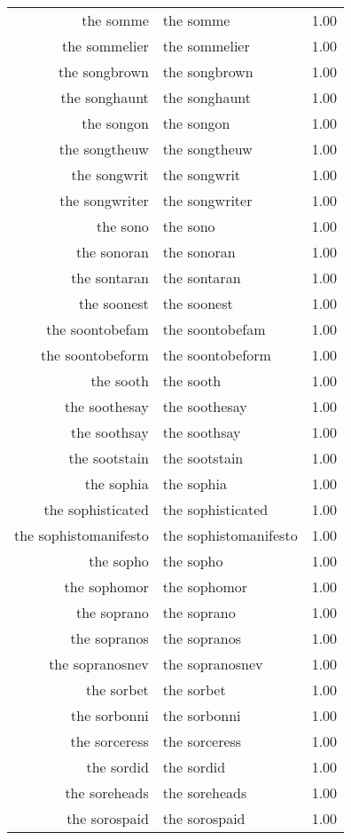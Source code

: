 \begin{table}[ht]
\begin{tabular}{rlr}
  the somme & the somme & 1.00 \\ 
  the sommelier & the sommelier & 1.00 \\ 
  the songbrown & the songbrown & 1.00 \\ 
  the songhaunt & the songhaunt & 1.00 \\ 
  the songon & the songon & 1.00 \\ 
  the songtheuw & the songtheuw & 1.00 \\ 
  the songwrit & the songwrit & 1.00 \\ 
  the songwriter & the songwriter & 1.00 \\ 
  the sono & the sono & 1.00 \\ 
  the sonoran & the sonoran & 1.00 \\ 
  the sontaran & the sontaran & 1.00 \\ 
  the soonest & the soonest & 1.00 \\ 
  the soontobefam & the soontobefam & 1.00 \\ 
  the soontobeform & the soontobeform & 1.00 \\ 
  the sooth & the sooth & 1.00 \\ 
  the soothesay & the soothesay & 1.00 \\ 
  the soothsay & the soothsay & 1.00 \\ 
  the sootstain & the sootstain & 1.00 \\ 
  the sophia & the sophia & 1.00 \\ 
  the sophisticated & the sophisticated & 1.00 \\ 
  the sophistomanifesto & the sophistomanifesto & 1.00 \\ 
  the sopho & the sopho & 1.00 \\ 
  the sophomor & the sophomor & 1.00 \\ 
  the soprano & the soprano & 1.00 \\ 
  the sopranos & the sopranos & 1.00 \\ 
  the sopranosnev & the sopranosnev & 1.00 \\ 
  the sorbet & the sorbet & 1.00 \\ 
  the sorbonni & the sorbonni & 1.00 \\ 
  the sorceress & the sorceress & 1.00 \\ 
  the sordid & the sordid & 1.00 \\ 
  the soreheads & the soreheads & 1.00 \\ 
  the sorospaid & the sorospaid & 1.00 \\ 

\end{tabular}
\end{table}
